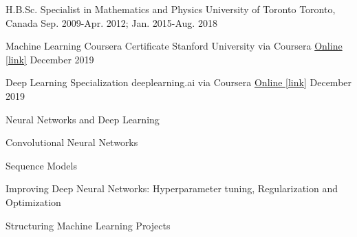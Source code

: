 

\begin{cventries}

  \cventry
    {H.B.Sc. Specialist in Mathematics and Physics} %
    {University of Toronto} %
    {Toronto, Canada} %
    {Sep. 2009-Apr. 2012; Jan. 2015-Aug. 2018} %
    {
    }

  \cventry
    {Machine Learning Coursera Certificate}
    {Stanford University via Coursera}
    {\href{https://www.coursera.org/account/accomplishments/verify/W8BC4NP4LTUW}{Online [link]}}
    {December 2019}
    {
    }

  \cventry
    {Deep Learning Specialization}
    {deeplearning.ai via Coursera}
    {\href{https://www.coursera.org/account/accomplishments/specialization/BFW768747MN5}{Online [link]}}
    {December 2019}
    {
      \begin{cvitems}
        \item{Neural Networks and Deep Learning}
        \item{Convolutional Neural Networks}
        \item{Sequence Models}
        \item{Improving Deep Neural Networks: Hyperparameter tuning, Regularization and Optimization}
        \item{Structuring Machine Learning Projects}
      \end{cvitems}
    }

\end{cventries}
